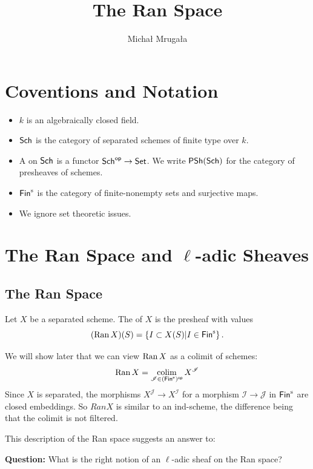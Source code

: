\documentclass[oneside]{amsart}
\title{The Ran Space}
\author{Micha{\l} Mruga{\l}a}
\newcommand{\CI}{\mathcal{I}}
\newcommand{\CJ}{\mathcal{J}}
\begin{document}
\maketitle

\setcounter{section}{0}
\section{Coventions and Notation}
\begin{itemize}
	\item $k$ is an algebraically closed field.
	\item $\mathsf{Sch}$ is the category of separated schemes of finite type over $k$.
	\item A  on $\mathsf{Sch}$ is a functor $\Sch\op\to \cat{Set}$. We write $\mathsf{PSh}(\mathsf{Sch})$ for the category of presheaves of schemes.
	\item $\Fins$ is the category of finite-nonempty sets and surjective maps.
	\item We ignore set theoretic issues.
\end{itemize}

\section{\texorpdfstring{The Ran Space and $\ell$-adic Sheaves}{The Ran Space and l-adic Sheaves}}
\subsection{The Ran Space}
\begin{definition}	
	Let $X$ be a separated scheme. The  of $X$ is the presheaf with values
	\[
		(\Ran X)(S) = \left\{ I\subset X(S) \middle| I \in \Fins \right\}.
	\] 
\end{definition}
We will show later that we can view $\operatorname{Ran} X$ as a colimit of schemes:
\[
\Ran X = \colim_{\CI\in (\Fins)\op} X^{\CI}
\] 
Since $X$ is separated, the morphisms $X^{\CJ}\to X^{\CI}$ for a morphism $\CI\to \CJ$ in $\Fins$ are closed embeddings. So $Ran X$ is similar to an ind-scheme, the difference being that the colimit is not filtered.

This description of the Ran space suggests an answer to:

\vspace{0.5em}
\begin{center}
	\textbf{Question:} What is the right notion of an $\ell$-adic sheaf on the Ran space?
\end{center}
\vspace{0.5em}
\end{document}
